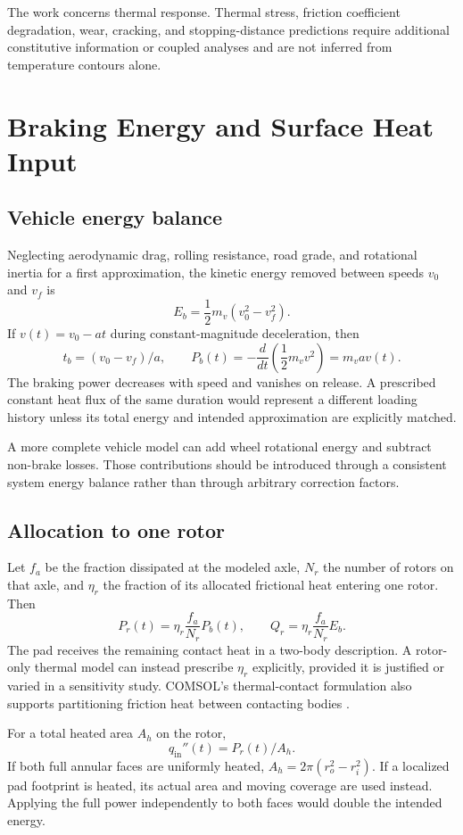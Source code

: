 \documentclass[11pt,a4paper]{article}
\newcommand{\sectionpage}[1]{\clearpage\section{#1}}
\begin{document}
The work concerns thermal response. Thermal stress, friction coefficient degradation, wear, cracking, and stopping-distance predictions require additional constitutive information or coupled analyses and are not inferred from temperature contours alone.

\sectionpage{Braking Energy and Surface Heat Input}
\subsection{Vehicle energy balance}
Neglecting aerodynamic drag, rolling resistance, road grade, and rotational inertia for a first approximation, the kinetic energy removed between speeds $v_0$ and $v_f$ is
\begin{equation}
E_b=\frac12m_v(v_0^2-v_f^2).
\end{equation}
If $v(t)=v_0-at$ during constant-magnitude deceleration, then
\begin{equation}
t_b=(v_0-v_f)/a,\qquad P_b(t)=-\frac{d}{dt}\left(\frac12m_vv^2\right)=m_vav(t).
\end{equation}
The braking power decreases with speed and vanishes on release. A prescribed constant heat flux of the same duration would represent a different loading history unless its total energy and intended approximation are explicitly matched.

A more complete vehicle model can add wheel rotational energy and subtract non-brake losses. Those contributions should be introduced through a consistent system energy balance rather than through arbitrary correction factors.

\subsection{Allocation to one rotor}
Let $f_a$ be the fraction dissipated at the modeled axle, $N_r$ the number of rotors on that axle, and $\eta_r$ the fraction of its allocated frictional heat entering one rotor. Then
\begin{equation}
P_r(t)=\eta_r\frac{f_a}{N_r}P_b(t),\qquad
Q_r=\eta_r\frac{f_a}{N_r}E_b.
\end{equation}
The pad receives the remaining contact heat in a two-body description. A rotor-only thermal model can instead prescribe $\eta_r$ explicitly, provided it is justified or varied in a sensitivity study. COMSOL's thermal-contact formulation also supports partitioning friction heat between contacting bodies \cite{contact}.

For a total heated area $A_h$ on the rotor,
\begin{equation}
q_{\mathrm{in}}''(t)=P_r(t)/A_h.
\end{equation}
If both full annular faces are uniformly heated, $A_h=2\pi(r_o^2-r_i^2)$. If a localized pad footprint is heated, its actual area and moving coverage are used instead. Applying the full power independently to both faces would double the intended energy.
\end{document}
